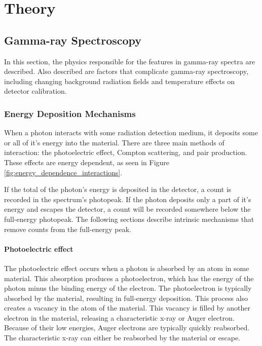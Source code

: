 \chapter{Theory}

\section{Gamma-ray Spectroscopy}

In this section, the physics responsible for the features in gamma-ray spectra are described. Also described are factors that complicate gamma-ray spectroscopy, including changing background radiation fields and temperature effects on detector calibration.


\subsection{Energy Deposition Mechanisms}

When a photon interacts with some radiation detection medium, it deposits some or all of it's energy into the material. There are three main methods of interaction: the photoelectric effect, Compton scattering, and pair production. These effects are energy dependent, as seen in Figure \ref{fig:energy_dependence_interactions}.

If the total of the photon's energy is deposited in the detector, a count is recorded in the spectrum's photopeak. If the photon deposits only a part of it's energy and escapes the detector, a count will be recorded somewhere below the full-energy photopeak.  The following sections describe intrinsic mechanisms that remove counts from the full-energy peak.%

\subsubsection{Photoelectric effect}

The photoelectric effect occurs when a photon is absorbed by an atom in some material. This absorption produces a photoelectron, which has the energy of the photon minus the binding energy of the electron. The photoelectron is typically absorbed by the material, resulting in full-energy deposition. This process also creates a vacancy in the atom of the material. This vacancy is filled by another electron in the material, releasing a characteristic x-ray or Auger electron. Because of their low energies, Auger electrons are typically quickly reabsorbed. The characteristic x-ray can either be reabsorbed by the material or escape.

